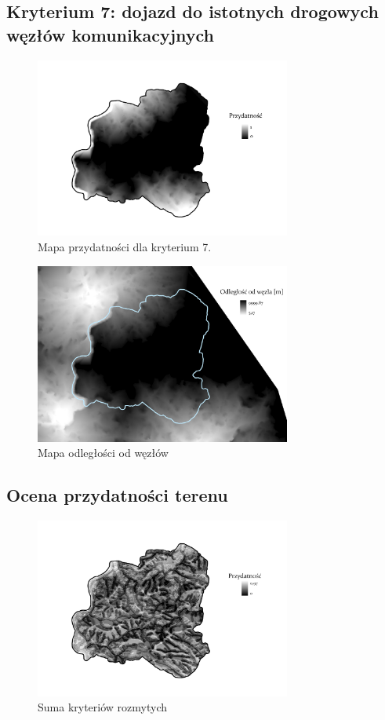 \documentclass{article}
\begin{document}
\subsection{Kryterium 7: dojazd do istotnych drogowych węzłów komunikacyjnych}

\begin{figure}[H]
    \centering
    \includegraphics[width=0.75\textwidth]{img/plesna-kryterium7-layout.jpg}
    \caption*{Mapa przydatności dla kryterium 7.}
\end{figure}

\begin{figure}[H]
    \centering
    \includegraphics[width=0.75\textwidth]{img/plesna-kryterium7-wezly.jpg}
    \caption*{Mapa odległości od węzłów}
\end{figure}

\subsection{Ocena przydatności terenu}
\begin{figure}[H]
    \centering
    \includegraphics[width=0.75\textwidth]{img/plesna-rozmyte-layout.jpg}
    \caption*{Suma kryteriów rozmytych}
\end{figure}
\end{document}
